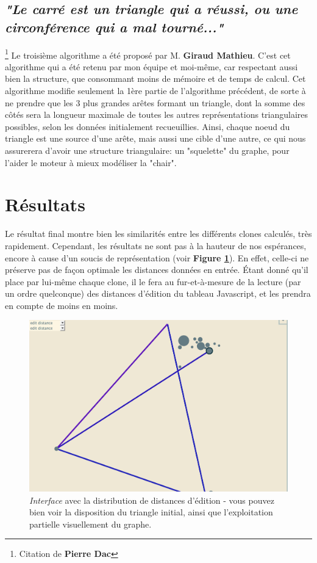 \documentclass[pdftex,12pt,a4paper]{report}
\begin{document}
\begin{spacing}{1.2}
\subsection{\textit{"Le carré est un triangle qui a réussi, ou une circonférence qui a mal tourné..."}}\footnote{Citation de \textbf{Pierre Dac}}
Le troisième algorithme a été proposé par M. \textbf{Giraud Mathieu}. C'est cet algorithme qui a été retenu par mon équipe et moi-même, car respectant aussi bien la structure, que consommant moins de mémoire et de temps de calcul.
\newline
Cet algorithme modifie seulement la 1ère partie de l'algorithme précédent, de sorte à ne prendre que les 3 plus grandes arêtes formant un triangle, dont la somme des côtés sera la longueur maximale de toutes les autres représentations triangulaires possibles, selon les données initialement recueuillies. Ainsi, chaque noeud du triangle est une source d'une arête, mais aussi une cible d'une autre, ce qui nous assurerera d'avoir une structure triangulaire: un "squelette" du graphe, pour l'aider le moteur à mieux modéliser la "chair".

\section{Résultats}

Le résultat final montre bien les similarités entre les différents clones calculés, très rapidement. Cependant, les résultats ne sont pas à la hauteur de nos espérances, encore à cause d'un soucis de représentation (voir \textbf{Figure \ref{fig:edit_distance}}).
En effet, celle-ci ne préserve pas de façon optimale les distances données en entrée. Étant donné qu'il place par lui-même chaque clone, il le fera au fur-et-à-mesure de la lecture (par un ordre quelconque) des distances d'édition du tableau Javascript, et les prendra en compte de moins en moins.

\begin{figure}[H]
\begin{center}
	\includegraphics[scale=0.5]{img/Edit-Distance-Ex.jpg}
\end{center}
\caption{\textit{Interface} avec la distribution de distances d'édition - vous pouvez bien voir la disposition du triangle initial, ainsi que l'exploitation partielle visuellement du graphe.}
\label{fig:edit_distance}
\end{figure}


\end{spacing}
\end{document}
